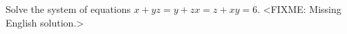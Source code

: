 \problem
Solve the system of equations $x + y z = y + z x = z + x y = 6$.
\solution
<FIXME: Missing English solution.>
\endproblem
